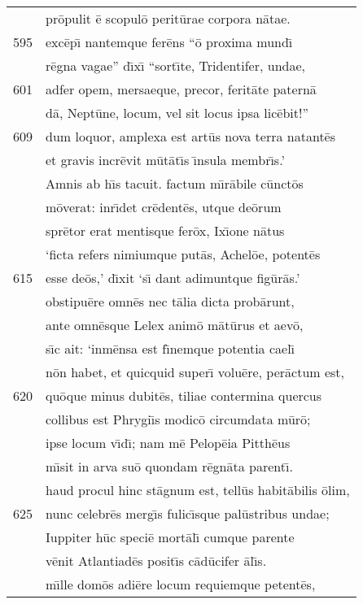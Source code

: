 \documentclass[paper=6in:9in,pagesize=pdftex,
               headinclude=on,footinclude=on,12pt]{scrbook}
\begin{document}
\begin{longtable}[p]{ r l }
 & pr\=opulit \=e scopul\=o perit\=urae corpora n\=atae.\\ 
595 & exc\=ep\={\i} nantemque fer\=ens ``\=o proxima mund\={\i}\\ 
 & r\=egna vagae'' d\={\i}x\={\i} ``sort\={\i}te, Tridentifer, undae,\\ 
601 & adfer opem, mersaeque, precor, ferit\=ate patern\=a\\ 
 & d\=a, Nept\=une, locum, vel sit locus ipsa lic\=ebit!''\\ 
609 & dum loquor, amplexa est art\=us nova terra natant\=es\\ 
 & et gravis incr\=evit m\=ut\=at\={\i}s \={\i}nsula membr\={\i}s.'\\ 
 & \indent Amnis ab h\={\i}s tacuit. factum m\={\i}r\=abile c\=unct\=os\\ 
 & m\=overat: inr\={\i}det cr\=edent\=es, utque de\=orum\\ 
 & spr\=etor erat mentisque fer\=ox, Ix\={\i}one n\=atus\\ 
 & `ficta refers nimiumque put\=as, Achel\=oe, potent\=es\\ 
615 & esse de\=os,' d\={\i}xit `s\={\i} dant adimuntque fig\=ur\=as.'\\ 
 & obstipu\=ere omn\=es nec t\=alia dicta prob\=arunt,\\ 
 & ante omn\=esque Lelex anim\=o m\=at\=urus et aev\=o,\\ 
 & s\={\i}c ait: `inm\=ensa est f\={\i}nemque potentia cael\={\i}\\ 
 & n\=on habet, et quicquid super\={\i} volu\=ere, per\=actum est,\\ 
620 & qu\=oque minus dubit\=es, tiliae contermina quercus\\ 
 & collibus est Phrygi\={\i}s modic\=o circumdata m\=ur\=o;\\ 
 & ipse locum v\={\i}d\={\i}; nam m\=e Pelop\=eia Pitth\=eus\\ 
 & m\={\i}sit in arva su\=o quondam r\=egn\=ata parent\={\i}.\\ 
 & haud procul hinc st\=agnum est, tell\=us habit\=abilis \=olim,\\ 
625 & nunc celebr\=es merg\={\i}s fulic\={\i}sque pal\=ustribus undae;\\ 
 & Iuppiter h\=uc speci\=e mort\=al\={\i} cumque parente\\ 
 & v\=enit Atlantiad\=es posit\={\i}s c\=ad\=ucifer \=al\={\i}s.\\ 
 & m\={\i}lle dom\=os adi\=ere locum requiemque petent\=es,\\ 

\end{longtable}
\end{document}
